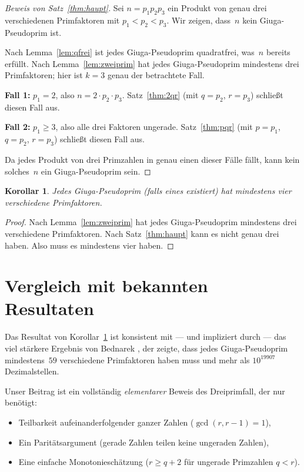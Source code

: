 \documentclass[12pt,a4paper]{amsart}
\newtheorem{corollary}[theorem]{Korollar}
\theoremstyle{definition}
\begin{document}
\begin{proof}[Beweis von Satz~\ref{thm:haupt}]
Sei $n = p_1 p_2 p_3$ ein Produkt von genau drei verschiedenen Primfaktoren
mit $p_1 < p_2 < p_3$. Wir zeigen, dass~$n$ kein Giuga-Pseudoprim ist.

Nach Lemma~\ref{lem:qfrei} ist jedes Giuga-Pseudoprim quadratfrei, was~$n$ bereits
erfüllt. Nach Lemma~\ref{lem:zweiprim} hat jedes Giuga-Pseudoprim mindestens drei
Primfaktoren; hier ist $k = 3$ genau der betrachtete Fall.

\textbf{Fall 1:} $p_1 = 2$, also $n = 2 \cdot p_2 \cdot p_3$.
Satz~\ref{thm:2qr} (mit $q = p_2$, $r = p_3$) schließt diesen Fall aus.

\textbf{Fall 2:} $p_1 \ge 3$, also alle drei Faktoren ungerade.
Satz~\ref{thm:pqr} (mit $p = p_1$, $q = p_2$, $r = p_3$) schließt diesen Fall aus.

Da jedes Produkt von drei Primzahlen in genau einen dieser Fälle fällt,
kann kein solches~$n$ ein Giuga-Pseudoprim sein.
\end{proof}

\begin{corollary}
\label{cor:vierprim}
Jedes Giuga-Pseudoprim (falls eines existiert) hat mindestens \emph{vier}
verschiedene Primfaktoren.
\end{corollary}

\begin{proof}
Nach Lemma~\ref{lem:zweiprim} hat jedes Giuga-Pseudoprim mindestens drei
verschiedene Primfaktoren. Nach Satz~\ref{thm:haupt} kann es nicht genau drei haben.
Also muss es mindestens vier haben.
\end{proof}

\section{Vergleich mit bekannten Resultaten}

Das Resultat von Korollar~\ref{cor:vierprim} ist konsistent mit — und impliziert durch —
das viel stärkere Ergebnis von Bednarek \cite{Bednarek2014}, der zeigte,
dass jedes Giuga-Pseudoprim mindestens~$59$ verschiedene Primfaktoren haben muss
und mehr als $10^{19907}$ Dezimalstellen.

Unser Beitrag ist ein vollständig \emph{elementarer} Beweis des Dreiprimfall,
der nur benötigt:
\begin{itemize}
  \item Teilbarkeit aufeinanderfolgender ganzer Zahlen ($\gcd(r, r-1) = 1$),
  \item Ein Paritätsargument (gerade Zahlen teilen keine ungeraden Zahlen),
  \item Eine einfache Monotonieschätzung ($r \ge q + 2$ für ungerade Primzahlen $q < r$).
\end{itemize}
\end{document}
